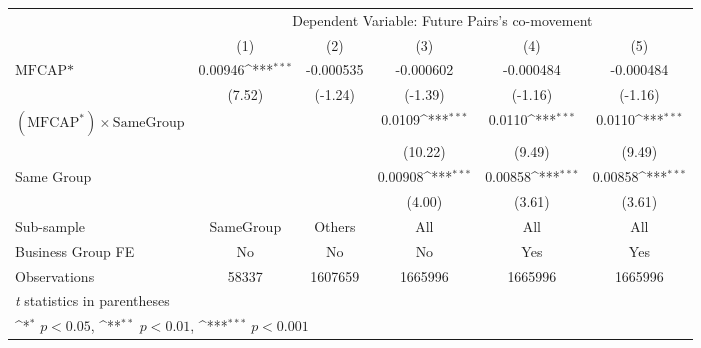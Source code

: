 {
\def\sym#1{\ifmmode^{#1}\else\(^{#1}\)\fi}
\begin{tabular}{l*{5}{c}}
\hline\hline
                &\multicolumn{5}{c}{Dependent Variable: Future Pairs's co-movement}                            \\\cmidrule(lr){2-6}
                &\multicolumn{1}{c}{(1)}         &\multicolumn{1}{c}{(2)}         &\multicolumn{1}{c}{(3)}         &\multicolumn{1}{c}{(4)}         &\multicolumn{1}{c}{(5)}         \\
\hline
$ \text{MFCAP*} $&  0.00946\sym{***}&-0.000535         &-0.000602         &-0.000484         &-0.000484         \\
                &   (7.52)         &  (-1.24)         &  (-1.39)         &  (-1.16)         &  (-1.16)         \\
[1em]
 $ (\text{MFCAP}^*) \times {\text{SameGroup} }  $ &                  &                  &   0.0109\sym{***}&   0.0110\sym{***}&   0.0110\sym{***}\\
                &                  &                  &  (10.22)         &   (9.49)         &   (9.49)         \\
[1em]
Same Group      &                  &                  &  0.00908\sym{***}&  0.00858\sym{***}&  0.00858\sym{***}\\
                &                  &                  &   (4.00)         &   (3.61)         &   (3.61)         \\
\hline
Sub-sample      &SameGroup         &   Others         &      All         &      All         &      All         \\
Business Group FE&       No         &       No         &       No         &      Yes         &      Yes         \\
Observations    &    58337         &  1607659         &  1665996         &  1665996         &  1665996         \\
\hline\hline
\multicolumn{6}{l}{\footnotesize \textit{t} statistics in parentheses}\\
\multicolumn{6}{l}{\footnotesize \sym{*} \(p<0.05\), \sym{**} \(p<0.01\), \sym{***} \(p<0.001\)}\\
\end{tabular}
}
